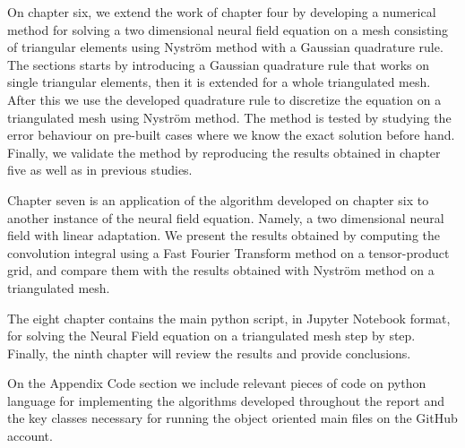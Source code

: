 \documentclass{uonmathreport}
\begin{document}
On chapter six, we extend the work of chapter four by developing a numerical method for solving a two dimensional neural field equation on a mesh consisting of triangular elements using Nystr\"om method with a Gaussian quadrature rule. The sections starts by introducing a Gaussian quadrature rule that works on single triangular elements, then it is extended for a whole triangulated mesh. After this we use the developed quadrature rule to discretize the equation on a triangulated mesh using Nystr\"om method. The method is tested by studying the error behaviour on pre-built cases where we know the exact solution before hand. Finally, we validate the method by reproducing the results obtained in chapter five as well as in previous studies.

Chapter seven is an application of the algorithm developed on chapter six to another instance of the neural field equation. Namely, a two dimensional neural field with linear adaptation. We present the results obtained by computing the convolution integral using a Fast Fourier Transform method on a tensor-product grid, and compare them with the results obtained with Nystr\"om method on a triangulated mesh.

The eight chapter contains the main python script, in Jupyter Notebook format, for solving the Neural Field equation on a triangulated mesh step by step. Finally, the ninth chapter will review the results and provide conclusions.

On the Appendix Code section we include relevant pieces of code on python language for implementing the algorithms developed throughout the report and the key classes necessary for running the object oriented main files on the GitHub account.
\end{document}
